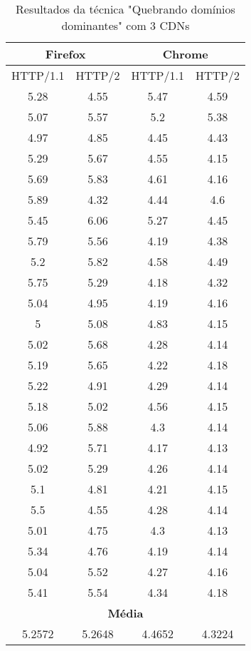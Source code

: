 \begin{table}[h]
	\centering
	\caption{Resultados da técnica "Quebrando domínios dominantes" com 3 CDNs}
	\label{resultados-quebrandodominiosdominantes-3}
	\begin{tabular}{cccc}
		\hline
		\multicolumn{2}{c}{\textbf{Firefox}} & \multicolumn{2}{c}{\textbf{Chrome}} \\
		\hline
		HTTP/1.1 & HTTP/2 & HTTP/1.1 & HTTP/2 \\
		\hline
		5.28 & 4.55 & 5.47 & 4.59 \\
		5.07 & 5.57 & 5.2 & 5.38 \\
		4.97 & 4.85 & 4.45 & 4.43 \\
		5.29 & 5.67 & 4.55 & 4.15 \\
		5.69 & 5.83 & 4.61 & 4.16 \\
		5.89 & 4.32 & 4.44 & 4.6 \\
		5.45 & 6.06 & 5.27 & 4.45 \\
		5.79 & 5.56 & 4.19 & 4.38 \\
		5.2 & 5.82 & 4.58 & 4.49 \\
		5.75 & 5.29 & 4.18 & 4.32 \\
		5.04 & 4.95 & 4.19 & 4.16 \\
		5 & 5.08 & 4.83 & 4.15 \\
		5.02 & 5.68 & 4.28 & 4.14 \\
		5.19 & 5.65 & 4.22 & 4.18 \\
		5.22 & 4.91 & 4.29 & 4.14 \\
		5.18 & 5.02 & 4.56 & 4.15 \\
		5.06 & 5.88 & 4.3 & 4.14 \\
		4.92 & 5.71 & 4.17 & 4.13 \\
		5.02 & 5.29 & 4.26 & 4.14 \\
		5.1 & 4.81 & 4.21 & 4.15 \\
		5.5 & 4.55 & 4.28 & 4.14 \\
		5.01 & 4.75 & 4.3 & 4.13 \\
		5.34 & 4.76 & 4.19 & 4.14 \\
		5.04 & 5.52 & 4.27 & 4.16 \\
		5.41 & 5.54 & 4.34 & 4.18 \\
		\hline
		\multicolumn{4}{c}{\textbf{Média}} \\
		5.2572 & 5.2648 & 4.4652 & 4.3224 \\
		\hline
	\end{tabular}
\end{table}
